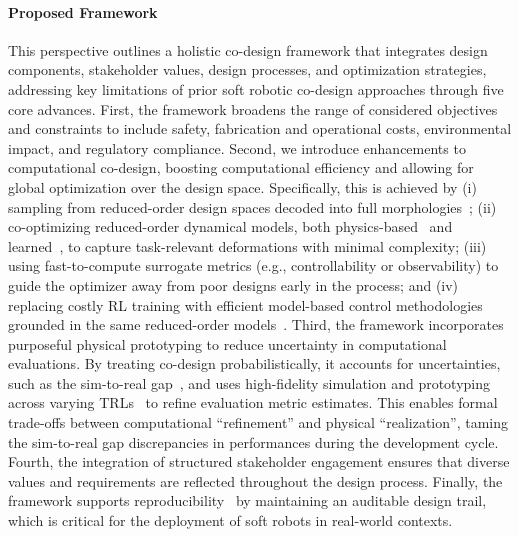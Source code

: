 \paragraph*{Proposed Framework}
This perspective outlines a holistic co-design framework that integrates design components, stakeholder values, design processes, and optimization strategies, addressing key limitations of prior soft robotic co-design approaches through five core advances.
First, the framework broadens the range of considered objectives and constraints to include safety, fabrication and operational costs, environmental impact, and regulatory compliance.
Second, we introduce enhancements to computational co-design, boosting computational efficiency and allowing for global optimization over the design space.
Specifically, this is achieved by (i) sampling from reduced-order design spaces decoded into full morphologies~\citep{wang2024diffusebot}; (ii) co-optimizing reduced-order dynamical models, both physics-based~\citep{armanini2023soft} and learned~\citep{liu2024physics, stolzle2024input, valadas2025learning, alkayas2025soft, navez2025modeling}, to capture task-relevant deformations with minimal complexity; (iii) using fast-to-compute surrogate metrics (e.g., controllability or observability) to guide the optimizer away from poor designs early in the process; and (iv) replacing costly \gls{RL} training with efficient model-based control methodologies grounded in the same reduced-order models~\citep{della2023model,stolzle2024input}.
Third, the framework incorporates purposeful physical prototyping to reduce uncertainty in computational evaluations.
By treating co-design probabilistically, it accounts for uncertainties, such as the sim-to-real gap~\citep{dubied2022sim}, and uses high-fidelity simulation and prototyping across varying \glspl{TRL}~\citep{NASA_TRL} to refine evaluation metric estimates.
This enables formal trade-offs between computational ``refinement'' and physical ``realization'', taming the sim-to-real gap discrepancies in performances during the development cycle.
Fourth, the integration of structured stakeholder engagement ensures that diverse values and requirements are reflected throughout the design process.
Finally, the framework supports reproducibility~\citep{baines2024need} by maintaining an auditable design trail, which is critical for the deployment of soft robots in real-world contexts.

